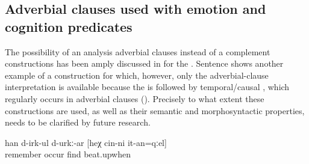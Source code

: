 \subsection{Adverbial clauses used with emotion and cognition predicates}
\label{ssec:Adverbial clauses used with emotion and cognition predicates}
The possibility of an analysis adverbial clauses instead of a complement constructions has been amply discussed in  for the . Sentence  shows another example of a construction for which, however, only the adverbial-clause interpretation is available because the  is followed by temporal/causal   , which regularly occurs in adverbial clauses (). Precisely to what extent these constructions are used, as well as their semantic and morphosyntactic properties, needs to be clarified by future research.


\begin{exe}
	\ex	\label{ex:‎He is probably remembering when he was beaten}
	\gll	han	d-irk-ul	d-urkː-ar	[heχ	cin-ni	it-an=qːel]\\
		remember	occur	find			beat.upwhen\\
	\glt	{}
\end{exe}
